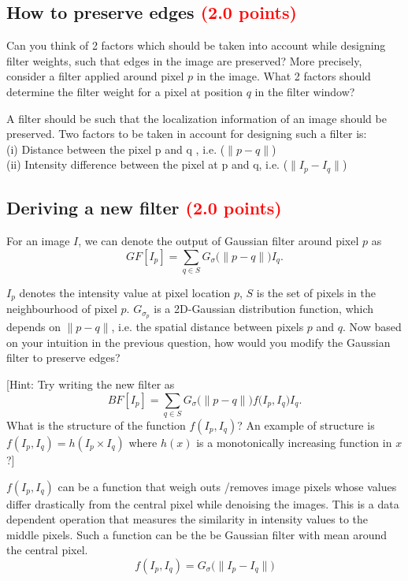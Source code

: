 \documentclass[answers]{exam}
\newcommand{\mypoints}[1]{\textcolor{red}{(#1 points)}}
\begin{document}
\subsection{How to preserve edges \mypoints{2.0}} \label{sssec:kernelshape}
Can you think of 2 factors which should be taken into account while designing filter weights, such that edges in the image are preserved? More precisely, consider a filter applied around pixel $p$ in the image. What 2 factors should determine the filter weight for a pixel at position $q$ in the filter window?
\begin{solution}
A filter should be such that the localization information of an image should be preserved.
Two factors to be taken in account for designing such a filter is:\\
(i) Distance between the pixel p and q , i.e. ($ \|p-q\|$)\\
(ii) Intensity difference between the pixel at p and q, i.e. ($ \|I_p-I_q\|$)
\end{solution}
    
\subsection{Deriving a new filter \mypoints{2.0}} \label{sssec:scenedepth}
For an image $I$, we can denote the output of Gaussian filter around pixel $p$ as $$ GF[I_p] = \sum_{q \in S} G_{\sigma}\big(\|p - q\|\big)I_{q}.$$

$I_p$ denotes the intensity value at pixel location $p$, $S$ is the set of pixels in the neighbourhood of pixel $p$. $G_{\sigma_p}$ is a 2D-Gaussian distribution function, which depends on $\|p - q\|$, i.e. the spatial distance between pixels $p$ and $q$. 
Now based on your intuition in the previous question, how would you modify the Gaussian filter to preserve edges? 

[Hint: Try writing the new filter as $$BF[I_p] = \sum_{q \in S} G_{\sigma}\big(\|p-q\|\big)f\big(I_{p}, I_{q}\big)I_q.$$ What is the structure of the function $f(I_{p}, I_{q})$? An example of structure is $f(I_{p}, I_{q}) = h(I_{p} \times I_{q})$ where $h(x)$ is a monotonically increasing function in $x$?]
\begin{solution}
$f(I_{p}, I_{q})$ can be a function that weigh outs /removes image pixels whose values differ drastically from the central pixel while denoising the images. This is a data dependent operation that measures the  similarity in intensity values to the middle pixels. Such a function can be the be Gaussian filter with mean around the central pixel.\\
$$f(I_{p}, I_{q}) = G_{\sigma} \big(\|I_{p}-I_{q}\|\big)$$

\end{solution}
\end{document}
